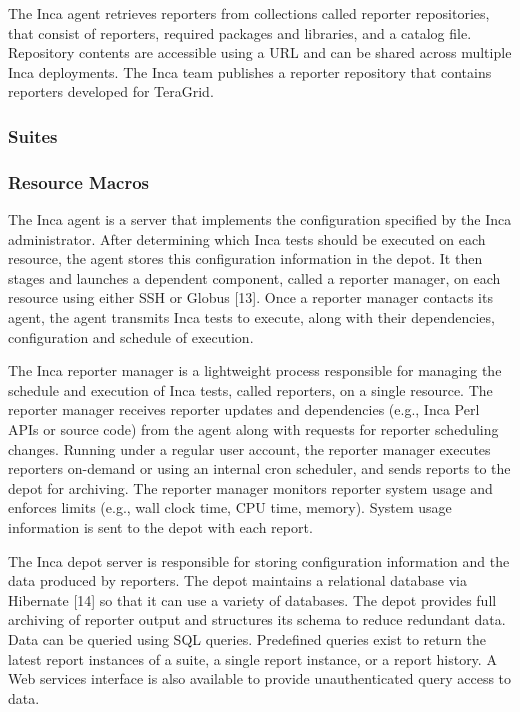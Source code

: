 \documentclass[times, 10pt,twocolumn]{article}
\begin{document}
The Inca agent retrieves reporters from collections called reporter
repositories, that consist of reporters, required packages and libraries,
and a catalog file. Repository contents are accessible using a URL and can
be shared across multiple Inca deployments. The Inca team publishes a
reporter repository that contains reporters developed for TeraGrid.  

\subsubsection{Suites}

\subsubsection{Resource Macros}


The Inca agent is a server that implements the configuration specified by the
Inca administrator.  After determining which Inca tests should be executed on
each resource, the agent stores this configuration information in the depot.
It then stages and launches a dependent component, called a reporter manager,
on each resource using either SSH or Globus [13].  Once a reporter manager
contacts its agent, the agent transmits Inca tests to execute, along with
their dependencies, configuration and schedule of execution. 
  


The Inca reporter manager is a lightweight process responsible for managing
the schedule and execution of Inca tests, called reporters, on a single
resource. The reporter manager receives reporter updates and dependencies
(e.g., Inca Perl APIs or source code) from the agent along with requests for
reporter scheduling changes.  Running under a regular user account, the
reporter manager executes reporters on-demand or using an internal cron
scheduler, and sends reports to the depot for archiving. The reporter
manager monitors reporter system usage and enforces limits (e.g., wall clock
time, CPU time, memory).  System usage information is sent to the depot with
each report. 




The Inca depot server is responsible for storing configuration information
and the data produced by reporters. The depot maintains a relational
database via Hibernate [14] so that it can use a variety of databases.  The
depot provides full archiving of reporter output and structures its schema
to reduce redundant data.  Data can be queried using SQL queries. Predefined
queries exist to return the latest report instances of a suite, a single
report instance, or a report history.  A Web services interface is also
available to provide unauthenticated query access to data.  
\end{document}
